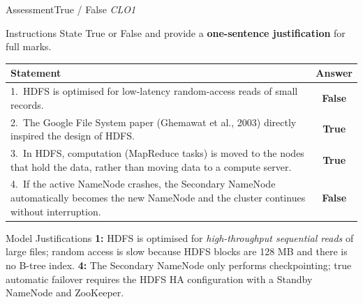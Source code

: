 \documentclass[aspectratio=169,10pt]{beamer}
\begin{document}
\begin{frame}{Assessment\textemdash True / False \hfill\small\textit{CLO1}}
  \begin{block}{Instructions}
    State True or False and provide a \textbf{one-sentence justification} for full marks.
  \end{block}
  \vspace{6pt}
  \centering
  \renewcommand{\arraystretch}{1.6}
  \begin{tabular}{p{9.0cm}c}
    \toprule
    \textbf{Statement} & \textbf{Answer} \\
    \midrule
    1.\ HDFS is optimised for low-latency random-access reads of small records. &
    \alert{\textbf{False}} \\
    2.\ The Google File System paper (Ghemawat et al., 2003) directly inspired the design of HDFS. &
    \textbf{True} \\
    3.\ In HDFS, computation (MapReduce tasks) is moved to the nodes that hold the data, rather than moving data to a compute server. &
    \textbf{True} \\
    4.\ If the active NameNode crashes, the Secondary NameNode automatically becomes the new NameNode and the cluster continues without interruption. &
    \alert{\textbf{False}} \\
    \bottomrule
  \end{tabular}
  \vspace{6pt}
  \begin{exampleblock}{Model Justifications}
    \small \textbf{1:} HDFS is optimised for \emph{high-throughput sequential reads} of large files; random access is slow because HDFS blocks are 128 MB and there is no B-tree index.  \textbf{4:} The Secondary NameNode only performs checkpointing; true automatic failover requires the HDFS HA configuration with a Standby NameNode and ZooKeeper.
  \end{exampleblock}
\end{frame}
\end{document}
